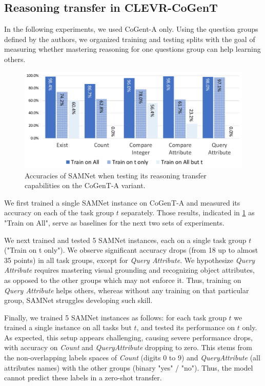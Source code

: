 \subsection{Reasoning transfer in CLEVR-CoGenT}
\label{sec:reasoning-transfer-clevr}
In the following experiments, we used CoGent-A only.
Using the question groups defined by the authors, we organized training and testing splits with the goal of measuring whether mastering reasoning for one questions group can help learning others.

\begin{figure}[htbp]
	\centering
	\includegraphics[width=\columnwidth]{../img/plots/cogent_reasoning_transfer.pdf}
	\caption{Accuracies of SAMNet when testing its reasoning transfer capabilities on the CoGenT-A variant.}
	\label{fig:cogent_reasoning_transfer}
\end{figure}

We first trained a single SAMNet instance on CoGenT-A and measured its accuracy on each of the task group $t$ separately.
Those results, indicated in \cref{fig:cogent_reasoning_transfer} as "Train on All", serve as baselines for the next two sets of experiments.

We next trained and tested 5 SAMNet instances, each on a single task group $t$ ("Train on t only").
We observe significant accuracy drops (from 18 up to almost 35 points) in all task groups, except for \textit{Query Attribute}.
We hypothesize \textit{Query Attribute} requires mastering visual grounding and recognizing object attributes, as opposed to the other groups which may not enforce it.
Thus, training on \textit{Query Attribute} helps others, whereas without any training on that particular group, SAMNet struggles developing such skill.

Finally, we trained 5 SAMNet instances as follows: for each task group $t$ we trained a single instance on all tasks but $t$, and tested its performance on $t$ only.
As expected, this setup appears challenging, causing severe performance drops, with accuracy on \textit{Count} and \textit{QueryAttribute} dropping to zero.
This stems from the non-overlapping labels spaces of \textit{Count} (digits 0 to 9) and \textit{QueryAttribute} (all attributes names) with the other groups (binary "yes" / "no"). Thus, the model cannot predict these labels in a zero-shot transfer.


